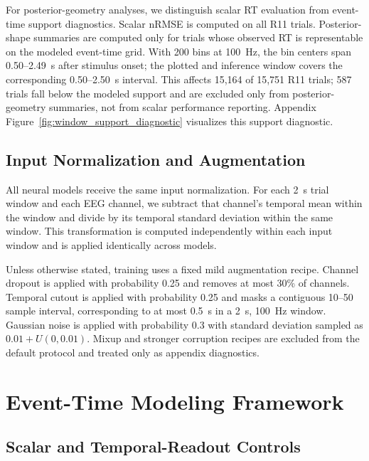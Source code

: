 \documentclass[12pt]{article}
\begin{document}
For posterior-geometry analyses, we distinguish scalar RT evaluation from event-time support diagnostics. Scalar nRMSE is computed on all R11 trials. Posterior-shape summaries are computed only for trials whose observed RT is representable on the modeled event-time grid. With 200 bins at 100~Hz, the bin centers span 0.50--2.49~s after stimulus onset; the plotted and inference window covers the corresponding 0.50--2.50~s interval. This affects 15{,}164 of 15{,}751 R11 trials; 587 trials fall below the modeled support and are excluded only from posterior-geometry summaries, not from scalar performance reporting. Appendix Figure~\ref{fig:window_support_diagnostic} visualizes this support diagnostic.

\subsection{Input Normalization and Augmentation}

All neural models receive the same input normalization. For each 2~s trial window and each EEG channel, we subtract that channel's temporal mean within the window and divide by its temporal standard deviation within the same window. This transformation is computed independently within each input window and is applied identically across models.

Unless otherwise stated, training uses a fixed mild augmentation recipe. Channel dropout is applied with probability 0.25 and removes at most 30\% of channels. Temporal cutout is applied with probability 0.25 and masks a contiguous 10--50 sample interval, corresponding to at most 0.5~s in a 2~s, 100~Hz window. Gaussian noise is applied with probability 0.3 with standard deviation sampled as $0.01 + U(0,0.01)$. Mixup and stronger corruption recipes are excluded from the default protocol and treated only as appendix diagnostics.

\section{Event-Time Modeling Framework}

\subsection{Scalar and Temporal-Readout Controls}

\label{sec:baseline_regression}
\end{document}
